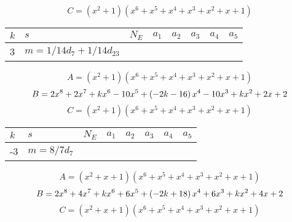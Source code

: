 \documentclass{amsart}
\begin{document}
$$C=(x^2
 + 1)(x^6
 + x^5
 + x^4
 + x^3
 + x^2
 + x
 + 1)$$
\begin{longtable}{|l|l|l|lllll|}
\hline
$k$ & $s$ & $N_E$ & $a_1$ & $a_2$ & $a_3$ & $a_4$ & $a_5$\\
\hline
3&$m=1/14d_{7}+1/14d_{23}$&&\multicolumn{5}{c|}{}\\
\hline
\end{longtable}
$$A=(x^2
 + 1)(x^6
 + x^5
 + x^4
 + x^3
 + x^2
 + x
 + 1)$$
$$B=2\*x^8
 + 2\*x^7
 + k\*x^6
 - 10\*x^5
 + \left(-2\*k
 - 16\right) \*x^4
 - 10\*x^3
 + k\*x^2
 + 2\*x
 + 2$$
$$C=(x^2
 + 1)(x^6
 + x^5
 + x^4
 + x^3
 + x^2
 + x
 + 1)$$
\begin{longtable}{|l|l|l|lllll|}
\hline
$k$ & $s$ & $N_E$ & $a_1$ & $a_2$ & $a_3$ & $a_4$ & $a_5$\\
\hline
-3&$m=8/7d_{7}$&&\multicolumn{5}{c|}{}\\
\hline
\end{longtable}
$$A=(x^2
 + x
 + 1)(x^6
 + x^5
 + x^4
 + x^3
 + x^2
 + x
 + 1)$$
$$B=2\*x^8
 + 4\*x^7
 + k\*x^6
 + 6\*x^5
 + \left(-2\*k
 + 18\right) \*x^4
 + 6\*x^3
 + k\*x^2
 + 4\*x
 + 2$$
$$C=(x^2
 + x
 + 1)(x^6
 + x^5
 + x^4
 + x^3
 + x^2
 + x
 + 1)$$
\end{document}
